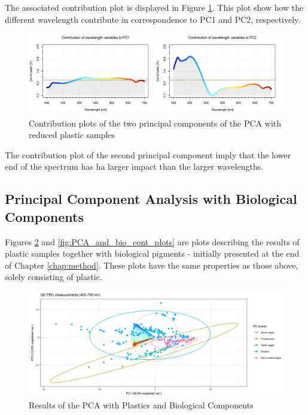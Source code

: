 \\\\%
\noindent
The associated contribution plot is displayed in Figure \ref{fig:PCA_plastics_doub_cont}. This plot show how the different wavelength contribute in correspondence to PC1 and PC2, respectively. 

\begin{figure}[H]
    \centering
    \includegraphics[width=1\textwidth]{Images/results/PCA_plastics_reduced_doub_cont.png}
    \caption{Contribution plots of the two principal components of the PCA with reduced plastic samples}
    \label{fig:PCA_plastics_doub_cont}
\end{figure}
\noindent
The contribution plot of the second principal component imply that the lower end of the spectrum has ha larger impact than the larger wavelengths. 

\subsection{Principal Component Analysis with Biological Components}
Figures \ref{fig:PCA_plastics_and_biology_scat} and \ref{fig:PCA_and_bio_cont_plots} are plots describing the results of plastic samples together with biological pigments - initially presented at the end of Chapter \ref{chap:method}. These plots have the same properties as those above, solely consisting of plastic.

\begin{figure}[H]
    \centering
    \includegraphics[width=1\textwidth]{Images/results/PCA_plastics_and_biology_scat_clust.png}
    \caption{Results of the PCA with Plastics and Biological Components}
    \label{fig:PCA_plastics_and_biology_scat}
\end{figure}



